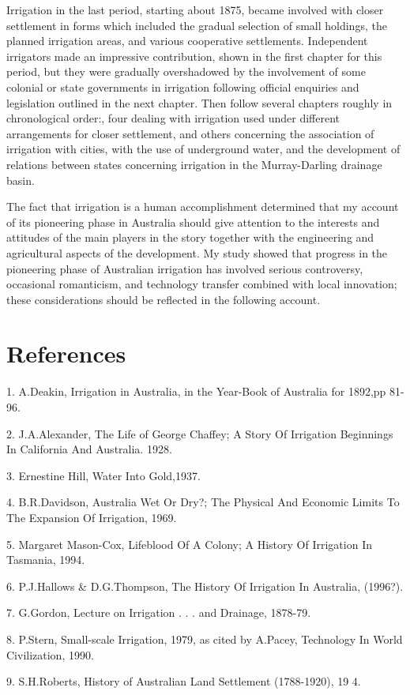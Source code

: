 Irrigation in the last period, starting about 1875, became involved
with closer settlement in forms which included the gradual selection
of small holdings, the planned irrigation areas, and various
cooperative settlements. Independent irrigators made an impressive
contribution, shown in the first chapter for this period, but they
were gradually overshadowed by the involvement of some colonial or
state governments in irrigation following official enquiries and
legislation outlined in the next chapter. Then follow several chapters
roughly in chronological order:, four dealing with irrigation used
under different arrangements for closer settlement, and others
concerning the association of irrigation with cities, with the use of
underground water, and the development of relations between states
concerning irrigation in the Murray-Darling drainage basin.

The fact that irrigation is a human accomplishment determined that my
account of its pioneering phase in Australia should give attention to
the interests and attitudes of the main players in the story together
with the engineering and agricultural aspects of the development. My
study showed that progress in the pioneering phase of Australian
irrigation has involved serious controversy, occasional romanticism,
and technology transfer combined with local innovation; these
considerations should be reflected in the following account.

\section{References}

1. A.Deakin, Irrigation in Australia, in the Year-Book of Australia
   for 1892,pp 81-96.

2. J.A.Alexander, The Life of George Chaffey; A Story Of Irrigation
    Beginnings In California And Australia. 1928.

3. Ernestine Hill, Water Into Gold,1937.

4. B.R.Davidson, Australia Wet Or Dry?; The Physical And Economic
    Limits To The Expansion Of Irrigation, 1969.

5. Margaret Mason-Cox, Lifeblood Of A Colony; A History Of Irrigation
    In Tasmania, 1994.

6. P.J.Hallows \& D.G.Thompson, The History Of Irrigation In Australia,
   (1996?).

7.  G.Gordon, Lecture on Irrigation . . . and Drainage, 1878-79.

8. P.Stern, Small-scale Irrigation, 1979, as cited by A.Pacey,
    Technology In World Civilization, 1990.

9. S.H.Roberts,  History of Australian Land Settlement (1788-1920), 19 4. 		    